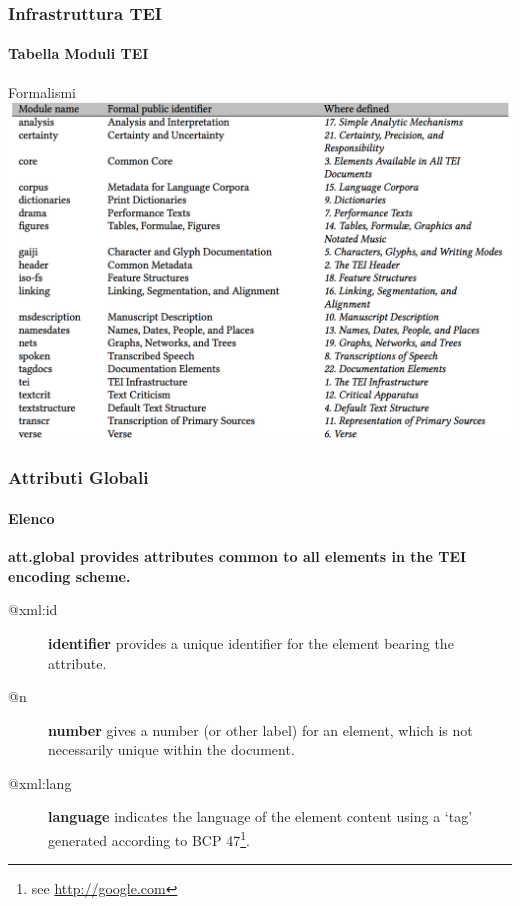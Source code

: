 




\begin{frame}
    \frametitle{Infrastruttura TEI}
    \framesubtitle{Tabella Moduli TEI}
    \addtocounter{nframe}{1}
    
    \begin{block}{Formalismi}
	    \includegraphics[width=.5\textwidth]{imgs/ModuliTEI.png}
    \end{block}
    

\end{frame}

\begin{frame}
    \frametitle{Attributi Globali}
    \framesubtitle{Elenco}
    \addtocounter{nframe}{1}


\textbf{\textrm{att.global} provides attributes common to all elements in the TEI encoding scheme.}

\begin{description}
    \item [@xml:id]     \textbf{identifier} provides a unique identifier for the element bearing the attribute.
    \item [@n]          \textbf{number} gives a number (or other label) for an element, which is not necessarily unique within the document.
    \item [@xml:lang]   \textbf{language} indicates the language of the element content using a ‘tag’ generated according to BCP 47\footnote{see \href{http://google.con}{http://google.com}}.
\end{description}

\end{frame}


